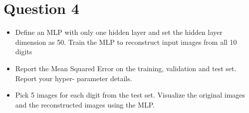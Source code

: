 
\section{Question 4}

\begin{itemize}
    \item  Define an MLP with only one hidden layer and set the hidden layer dimension as 50. Train
    the MLP to reconstruct input images from all 10 digits
    \item  Report the Mean Squared Error on the training, validation and test set. Report your hyper-
    parameter details.
    \item Pick 5 images for each digit from the test set. Visualize the original images and the reconstructed images using the MLP.
   
\end{itemize}

